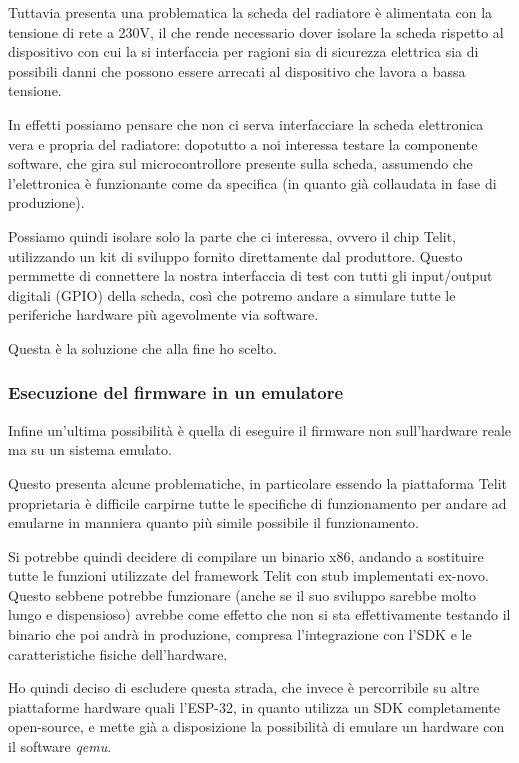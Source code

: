 \documentclass[a4paper,titlepage]{article}
\begin{document}
Tuttavia presenta una problematica la scheda del radiatore è alimentata con
la tensione di rete a 230V, il che rende necessario dover isolare la scheda rispetto
al dispositivo con cui la si interfaccia per ragioni sia di sicurezza elettrica sia
di possibili danni che possono essere arrecati al dispositivo che lavora a bassa tensione.

In effetti possiamo pensare che non ci serva interfacciare la scheda elettronica
vera e propria del radiatore: dopotutto a noi interessa testare la componente software,
che gira sul microcontrollore presente sulla scheda, assumendo che l'elettronica è
funzionante come da specifica (in quanto già collaudata in fase di produzione).

Possiamo quindi isolare solo la parte che ci interessa, ovvero il chip Telit, utilizzando
un kit di sviluppo fornito direttamente dal produttore. Questo permmette di connettere
la nostra interfaccia di test con tutti gli input/output digitali (GPIO) della scheda,
così che potremo andare a simulare tutte le periferiche hardware più agevolmente via software.

Questa è la soluzione che alla fine ho scelto.

\subsubsection{Esecuzione del firmware in un emulatore}

Infine un'ultima possibilità è quella di eseguire il firmware non sull'hardware
reale ma su un sistema emulato.

Questo presenta alcune problematiche, in particolare essendo la piattaforma Telit
proprietaria è difficile carpirne tutte le specifiche di funzionamento per andare
ad emularne in manniera quanto più simile possibile il funzionamento.

Si potrebbe quindi decidere di compilare un binario x86, andando a sostituire tutte
le funzioni utilizzate del framework Telit con stub implementati ex-novo. Questo
sebbene potrebbe funzionare (anche se il suo sviluppo sarebbe molto lungo e dispensioso)
avrebbe come effetto che non si sta effettivamente testando il binario che poi andrà
in produzione, compresa l'integrazione con l'SDK e le caratteristiche fisiche dell'hardware.

Ho quindi deciso di escludere questa strada, che invece è percorribile su altre
piattaforme hardware quali l'ESP-32, in quanto utilizza un SDK completamente open-source,
e mette già a disposizione la possibilità di emulare un hardware con il software \textit{qemu}.
\end{document}
